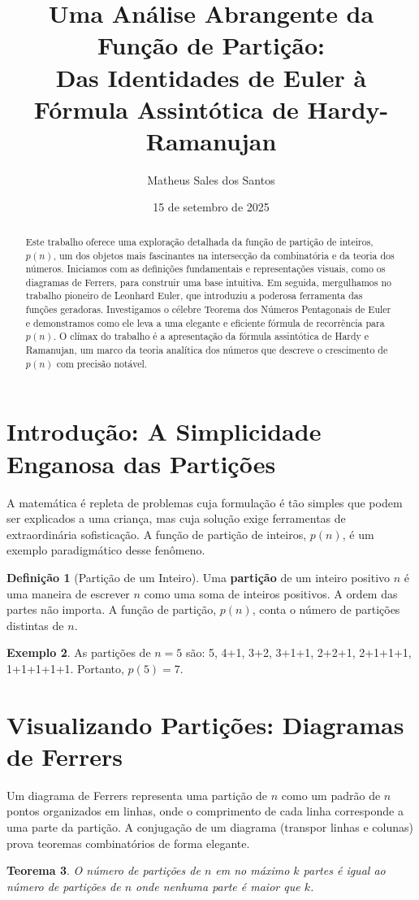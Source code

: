 \documentclass[12pt, a4paper]{article}
\title{\textbf{Uma Análise Abrangente da Função de Partição:\\ Das Identidades de Euler à Fórmula Assintótica de Hardy-Ramanujan}}
\author{Matheus Sales dos Santos}
\date{15 de setembro de 2025}
\newtheorem{theorem}{Teorema}[section]
\theoremstyle{definition}
\newtheorem{definition}[theorem]{Definição}
\newtheorem{example}[theorem]{Exemplo}
\theoremstyle{remark}
\begin{document}
\maketitle

\begin{abstract}
\noindent Este trabalho oferece uma exploração detalhada da função de partição de inteiros, $p(n)$, um dos objetos mais fascinantes na intersecção da combinatória e da teoria dos números. Iniciamos com as definições fundamentais e representações visuais, como os diagramas de Ferrers, para construir uma base intuitiva. Em seguida, mergulhamos no trabalho pioneiro de Leonhard Euler, que introduziu a poderosa ferramenta das funções geradoras. Investigamos o célebre Teorema dos Números Pentagonais de Euler e demonstramos como ele leva a uma elegante e eficiente fórmula de recorrência para $p(n)$. O clímax do trabalho é a apresentação da fórmula assintótica de Hardy e Ramanujan, um marco da teoria analítica dos números que descreve o crescimento de $p(n)$ com precisão notável.
\end{abstract}

\tableofcontents
\newpage

\section{Introdução: A Simplicidade Enganosa das Partições}
A matemática é repleta de problemas cuja formulação é tão simples que podem ser explicados a uma criança, mas cuja solução exige ferramentas de extraordinária sofisticação. A função de partição de inteiros, $p(n)$, é um exemplo paradigmático desse fenômeno.
\begin{definition}[Partição de um Inteiro]
Uma \textbf{partição} de um inteiro positivo $n$ é uma maneira de escrever $n$ como uma soma de inteiros positivos. A ordem das partes não importa. A função de partição, $p(n)$, conta o número de partições distintas de $n$.
\end{definition}
\begin{example}
As partições de $n=5$ são: 5, 4+1, 3+2, 3+1+1, 2+2+1, 2+1+1+1, 1+1+1+1+1. Portanto, $p(5) = 7$.
\end{example}

\section{Visualizando Partições: Diagramas de Ferrers}
Um diagrama de Ferrers representa uma partição de $n$ como um padrão de $n$ pontos organizados em linhas, onde o comprimento de cada linha corresponde a uma parte da partição. A conjugação de um diagrama (transpor linhas e colunas) prova teoremas combinatórios de forma elegante.
\begin{theorem}
O número de partições de $n$ em no máximo $k$ partes é igual ao número de partições de $n$ onde nenhuma parte é maior que $k$.
\end{theorem}
\end{document}

